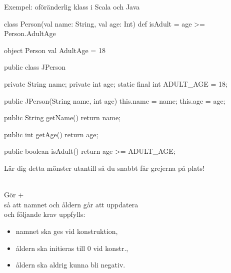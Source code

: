 \begin{Slide}{Exempel: oföränderlig klass i Scala och Java}\SlideFontTiny
\vspace{-1em}
\begin{multicols}{2}
\begin{CodeSmall}[basicstyle=\ttfamily\SlideFontSize{5.7}{6.7}]
class Person(val name: String, val age: Int){
  def isAdult = age >= Person.AdultAge
}

object Person {
  val AdultAge = 18
}
\end{CodeSmall}

\columnbreak

\pause
\begin{CodeSmall}[language=Java,basicstyle=\ttfamily\SlideFontSize{5.7}{6.7}]
public class JPerson {
    private String name;
    private int age;
    static final int ADULT_AGE = 18;
      
    public JPerson(String name, int age) {
      this.name = name;
      this.age = age;
    }

    public String getName() {
        return name;
    }

    public int getAge() {
        return age;
    }
    
    public boolean isAdult() {
        return age >= ADULT_AGE;
    }
}
\end{CodeSmall}
Lär dig detta mönster utantill så du snabbt får grejerna på plats!
\end{multicols}
\pause\vspace{-11em} 
\\Gör  +  \\så att namnet och åldern går att uppdatera\\och följande krav uppfylls:
\begin{itemize}
\item namnet ska ges vid konstruktion,
\item åldern ska initieras till 0 vid konstr.,
\item åldern ska aldrig kunna bli negativ.
\end{itemize}
\end{Slide}


